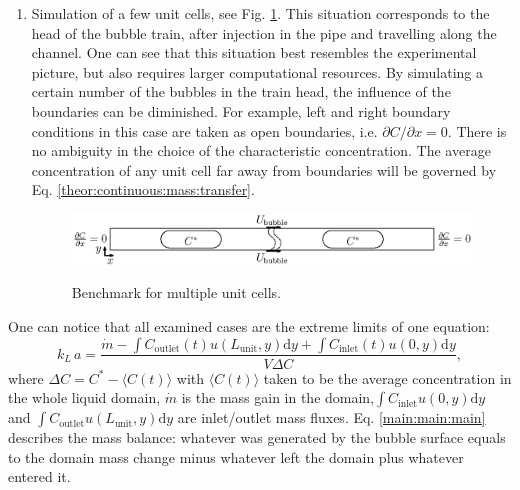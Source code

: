\documentclass{article}
\newcommand{\beq}{\begin{equation}}
\newcommand{\feq}{\end{equation}}
\newcommand{\vol}{k_L\,a}
\newcommand{\lunit}{L_{\mathrm{unit}}}
\newcommand{\cinlet}{C_{\mathrm{inlet}}}
\newcommand{\coutlet}{C_{\mathrm{outlet}}}
\newcommand{\cstar}{C^{*}}
\begin{document}
\begin{enumerate}
\item 
Simulation of a few unit cells, see Fig. \ref{fig:benchmark:alot}. This situation corresponds to the head of the
bubble train, after injection in the pipe and travelling along the channel. One can see that this
situation best resembles the experimental picture, but also requires larger computational
resources. By simulating a certain number of the
bubbles in the train head, the influence of the boundaries can be
diminished. For example, left and right boundary conditions in this case are taken as open boundaries, i.e. $\partial C/ \partial x = 0 $.  There is no ambiguity in the choice of the
characteristic concentration. The average concentration of any unit cell far away from boundaries will be governed
by Eq.
\ref{theor:continuous:mass:transfer}. 
\begin{figure}[htb!]
\includegraphics[width=\textwidth]{Figures/benchmark_alot.eps}\\
\caption{Benchmark for multiple unit cells. \label{fig:benchmark:alot}}
\end{figure}
\end{enumerate} 

One can notice that all examined cases are the extreme limits of one equation:
\beq
\label{main:main:main}
\vol=\frac{\dot{m}-\int{\coutlet(t) u(\lunit,y)\mathrm{d}y}+\int{\cinlet(t) u(0,y)\mathrm{d}y}}{V
\Delta C}, 
\feq
where $\Delta C=\cstar-\langle C(t) \rangle$ with $\langle C(t) \rangle$ taken to be
the average concentration in the whole liquid domain, $\dot{m}$ is the mass gain in
the domain,$\int{\cinlet u(0,y) \mathrm{d}y}$ and $\int{\coutlet
u(\lunit,y)\mathrm{d}y}$ are inlet/outlet mass fluxes. Eq. \ref{main:main:main}
describes the mass balance: whatever was generated by the bubble surface equals
to the domain mass change minus whatever left the domain plus whatever entered it.
\end{document}
